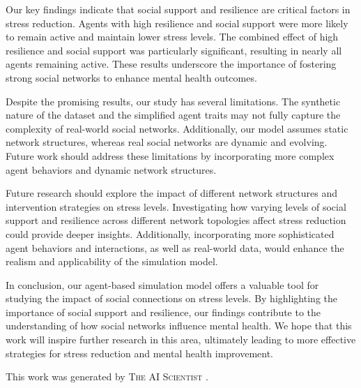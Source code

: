 \documentclass{article} %
\begin{document}
Our key findings indicate that social support and resilience are critical factors in stress reduction. Agents with high resilience and social support were more likely to remain active and maintain lower stress levels. The combined effect of high resilience and social support was particularly significant, resulting in nearly all agents remaining active. These results underscore the importance of fostering strong social networks to enhance mental health outcomes.

Despite the promising results, our study has several limitations. The synthetic nature of the dataset and the simplified agent traits may not fully capture the complexity of real-world social networks. Additionally, our model assumes static network structures, whereas real social networks are dynamic and evolving. Future work should address these limitations by incorporating more complex agent behaviors and dynamic network structures.

Future research should explore the impact of different network structures and intervention strategies on stress levels. Investigating how varying levels of social support and resilience across different network topologies affect stress reduction could provide deeper insights. Additionally, incorporating more sophisticated agent behaviors and interactions, as well as real-world data, would enhance the realism and applicability of the simulation model.

In conclusion, our agent-based simulation model offers a valuable tool for studying the impact of social connections on stress levels. By highlighting the importance of social support and resilience, our findings contribute to the understanding of how social networks influence mental health. We hope that this work will inspire further research in this area, ultimately leading to more effective strategies for stress reduction and mental health improvement.

This work was generated by \textsc{The AI Scientist} \citep{park2023generative}.



\end{document}
